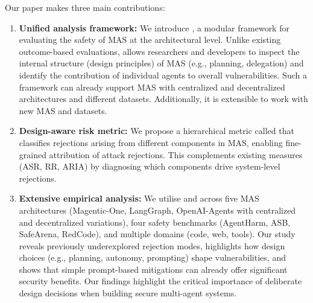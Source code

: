 Our paper makes three main contributions:
\begin{enumerate}%
    \item \textbf{Unified analysis framework:} We introduce \textbf{\safeagentsn}, a modular framework for evaluating the safety of MAS at the architectural level. Unlike existing outcome-based evaluations, \textbf{\safeagentsn} allows researchers and developers to inspect the internal structure (design principles) of MAS (e.g., planning, delegation) and identify the contribution of individual agents to overall vulnerabilities. Such a framework can already support MAS with centralized and decentralized architectures and different datasets. Additionally, it is extensible to work with new MAS and datasets.
    \item \textbf{Design-aware risk metric:} We propose a hierarchical metric called \metricn that classifies rejections arising from different components in MAS, enabling fine-grained attribution of attack rejections. This complements existing measures (ASR, RR, ARIA) by diagnosing which components drive system-level rejections.
    \item \textbf{Extensive empirical analysis:} We utilise \safeagentsn and \metricn across five MAS architectures (Magentic-One, LangGraph, OpenAI-Agents with centralized and decentralized variations), four safety benchmarks (AgentHarm, ASB, SafeArena, RedCode), and multiple domains (code, web, tools). Our study reveals previously underexplored rejection modes, highlights how design choices (e.g., planning, autonomy, prompting) shape vulnerabilities, and shows that simple prompt-based mitigations can already offer significant security benefits.
Our findings highlight the critical importance of deliberate design decisions when building secure multi-agent systems.
\end{enumerate}


